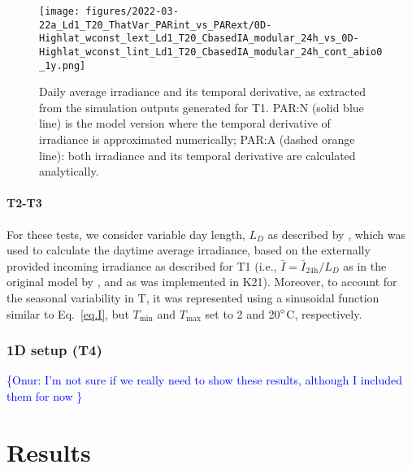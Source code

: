 \documentclass[gmd, manuscript]{copernicus}
\newcommand{\onur}[1]{\textcolor{blue}{\{Onur: #1\}}}
\begin{document}
    \begin{figure}[ht!]
    \texttt{[image: figures/2022-03-22a\_Ld1\_T20\_ThatVar\_PARint\_vs\_PARext/0D-Highlat\_wconst\_lext\_Ld1\_T20\_CbasedIA\_modular\_24h\_vs\_0D-Highlat\_wconst\_lint\_Ld1\_T20\_CbasedIA\_modular\_24h\_cont\_abio0\_1y.png]}
    \caption{Daily average irradiance and its temporal derivative, as extracted from the simulation outputs generated for T1. PAR:N (solid blue line) is the model version where the temporal derivative of irradiance is approximated numerically; PAR:A (dashed orange line): both irradiance and its temporal derivative are calculated analytically.\label{f.T1light}}
    \end{figure}

    \paragraph{T2-T3}
    For these tests, we consider variable day length, $L_D$ as described by \citet{Forsythe2003}, which was used to calculate the daytime average irradiance, based on the externally provided incoming irradiance as described for T1 (i.e., $\bar{I}=\bar{I}_{\text{24h}}/L_D$ as in the original model by \citep{Pahlowetal13}, and as was implemented in K21). Moreover, to account for the seasonal variability in T, it was represented using a sinusoidal function similar to Eq.~\ref{eq.I}, but $T_{\min}$ and $T_{\max}$ set to 2 and 20$^{\circ}$C, respectively.
    
\subsubsection{1D setup (T4)}
    \onur{I'm not sure if we really need to show these results, although I included them for now }




\section{Results}
\end{document}

